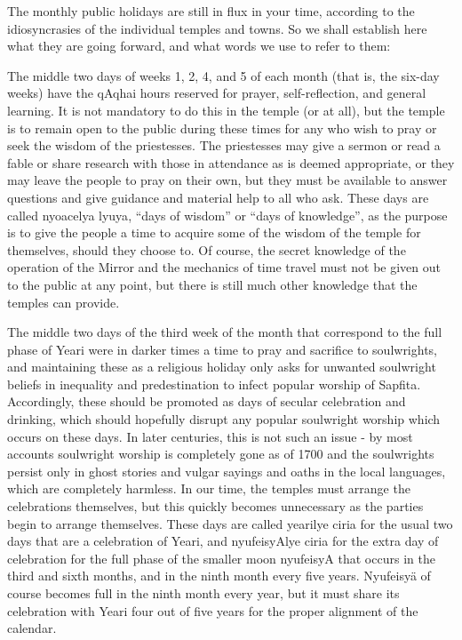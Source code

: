 \documentclass{article}
\begin{document}
The monthly public holidays are still in flux in your time, according to the idiosyncrasies of the individual temples and towns.  So we shall establish here what they are going forward, and what words we use to refer to them:

The middle two days of weeks 1, 2, 4, and 5 of each month (that is, the six-day weeks) have the {\quch qAqhai} hours reserved for prayer, self-reflection, and general learning.  It is not mandatory to do this in the temple (or at all), but the temple is to remain open to the public during these times for any who wish to pray or seek the wisdom of the priestesses.  The priestesses may give a sermon or read a fable or share research with those in attendance as is deemed appropriate, or they may leave the people to pray on their own, but they must be available to answer questions and give guidance and material help to all who ask.  These days are called {\quch nyoacelya lyuya}, ``days of wisdom'' or ``days of knowledge'', as the purpose is to give the people a time to acquire some of the wisdom of the temple for themselves, should they choose to.  Of course, the secret knowledge of the operation of the Mirror and the mechanics of time travel must not be given out to the public at any point, but there is still much other knowledge that the temples can provide.

The middle two days of the third week of the month that correspond to the full phase of Yeari were in darker times a time to pray and sacrifice to soulwrights, and maintaining these as a religious holiday only asks for unwanted soulwright beliefs in inequality and predestination to infect popular worship of Sapfita.  Accordingly, these should be promoted as days of secular celebration and drinking, which should hopefully disrupt any popular soulwright worship which occurs on these days.  In later centuries, this is not such an issue - by most accounts soulwright worship is completely gone as of 1700 and the soulwrights persist only in ghost stories and vulgar sayings and oaths in the local languages, which are completely harmless.  In our time, the temples must arrange the celebrations themselves, but this quickly becomes unnecessary as the parties begin to arrange themselves. These days are called {\quch yearilye ciria} for the usual two days that are a celebration of Yeari, and {\quch nyufeisyAlye ciria} for the extra day of celebration for the full phase of the smaller moon {\quch nyufeisyA} that occurs in the third and sixth months, and in the ninth month every five years.  Nyufeisy\"a of course becomes full in the ninth month every year, but it must share its celebration with Yeari four out of five years for the proper alignment of the calendar.
\end{document}
